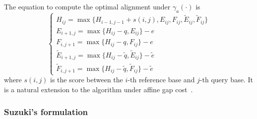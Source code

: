 \documentclass{bioinfo}
\begin{document}
\begin{methods}
The equation to compute the optimal alignment under $\gamma_a(\cdot)$ is
\begin{equation}\label{eq:ae86}
\left\{\begin{array}{l}
H_{ij} = \max\{H_{i-1,j-1}+s(i,j),E_{ij},F_{ij},\tilde{E}_{ij},\tilde{F}_{ij}\}\\
E_{i+1,j}= \max\{H_{ij}-q,E_{ij}\}-e\\
F_{i,j+1}= \max\{H_{ij}-q,F_{ij}\}-e\\
\tilde{E}_{i+1,j}= \max\{H_{ij}-\tilde{q},\tilde{E}_{ij}\}-\tilde{e}\\
\tilde{F}_{i,j+1}= \max\{H_{ij}-\tilde{q},\tilde{F}_{ij}\}-\tilde{e}
\end{array}\right.
\end{equation}
where $s(i,j)$ is the score between the $i$-th reference base and $j$-th query
base. It is a natural extension to the algorithm under affine gap
cost~\citep{Gotoh:1982aa,Altschul:1986aa}.

\subsubsection{Suzuki's formulation}


\end{methods}
\end{document}
